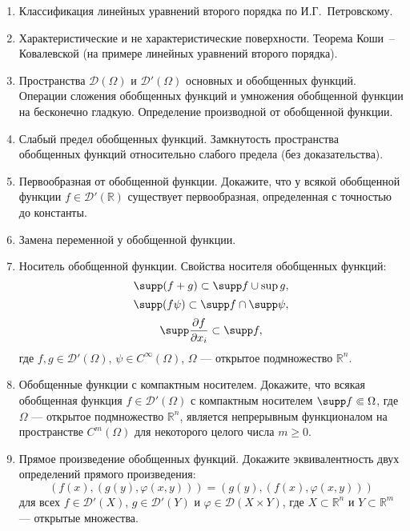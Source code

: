 \documentclass[12pt,a4paper,draft]{article}
\DeclareRobustCommand*{\т}{~--- }
\DeclareRobustCommand*{\ч}{~-- }
\begin{document}
\begin{enumerate}

\item
Классификация линейных уравнений второго порядка по
И.Г.~Петровскому.

\item
Характеристические и не характеристические поверхности. Теорема
Коши\ч Ковалевской (на примере линейных уравнений второго
порядка).

\item
Пространства ${\mathcal D} (\Omega)$ и ${\mathcal D}' (\Omega)$
основных и обобщенных функций. Операции сложения обобщенных
функций и умножения обобщенной функции на бесконечно гладкую.
Определение производной от обобщенной функции.

\item
Слабый предел обобщенных функций. Замкнутость пространства
обобщенных функций относительно слабого предела (без
доказательства).

\item
Первообразная от обобщенной функции. Докажите, что у всякой
обобщенной функции $f \in {\mathcal D}' ({\mathbb R})$ существует
первообразная, определенная с точностью до константы.


\item
Замена переменной у обобщенной функции.

\item
Носитель обобщенной функции. Свойства носителя обобщенных функций:
$$
    \supp (f + g)
    \subset
    \supp f \cup \sup g,
$$
$$
    \supp (f \psi)
    \subset
    \supp f \cap \supp \psi,
$$
$$
    \supp \frac{\partial f }{\partial x_i}
    \subset
    \supp f,
$$
где $f,g \in {\mathcal D}' (\Omega)$, $\psi \in C^\infty
(\Omega)$, $\Omega$ --- открытое подмножество ${\mathbb R}^n$.

\item
Обобщенные функции с компактным носителем. Докажите, что всякая
обобщенная функция $f \in {\mathcal D}' (\Omega)$ с компактным
носителем $\supp f \Subset \Omega$, где $\Omega$ --- открытое
подмножество ${\mathbb R}^n$, является непрерывным функционалом на
пространстве $C^m (\Omega)$ для некоторого целого числа $m \ge 0$.

\item
Прямое произведение обобщенных функций. Докажите эквивалентность
двух определений прямого произведения:
$$
    (f (x), (g (y), \varphi (x, y)))
    =
    (g (y), (f (x), \varphi (x, y)))
$$
для всех $f \in {\mathcal D}' (X)$, $g \in {\mathcal D}' (Y)$ и
$\varphi \in {\mathcal D} (X \times Y)$, где $X \subset {\mathbb
R}^n$ и $Y \subset {\mathbb R}^m$
--- открытые множества.


\end{enumerate}
\end{document}
